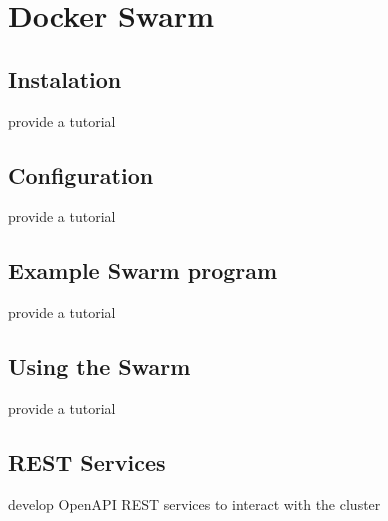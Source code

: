 \chapter{Docker Swarm}


\section{Instalation}

\begin{exercise}
provide a tutorial 
\end{exercise}

\section{Configuration}

\begin{exercise}
provide a tutorial 
\end{exercise}

\section{Example Swarm program}

\begin{exercise}
provide a tutorial 
\end{exercise}

\section{Using the Swarm}

\begin{exercise}
provide a tutorial 
\end{exercise}

\section{REST Services}

\begin{exercise}
develop OpenAPI REST services to interact with the cluster
\end{exercise}

